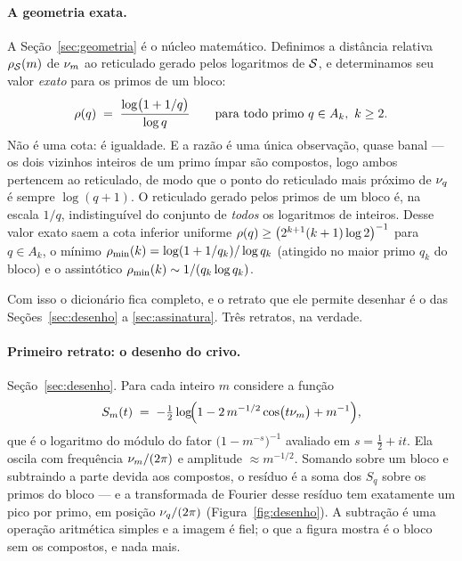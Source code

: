 \paragraph{A geometria exata.} A Seção~\ref{sec:geometria} é o núcleo matemático.
Definimos a distância relativa $\rho_{\mathcal{S}}(m)$ de $\nu_{m}$ ao reticulado
gerado pelos logaritmos de $\mathcal{S}$, e determinamos seu valor \emph{exato} para os
primos de um bloco:
\begin{equation}\label{eq:rhoexato}
  \rho(q) \;=\; \frac{\log\bigl(1+1/q\bigr)}{\log q}
  \qquad \text{para todo primo } q \in A_k,\ k\ge 2 .
\end{equation}
Não é uma cota: é igualdade. E a razão é uma única observação, quase banal — os
dois vizinhos inteiros de um primo ímpar são compostos, logo ambos pertencem ao
reticulado, de modo que o ponto do reticulado mais próximo de $\nu_{q}$ é sempre
$\log(q+1)$. O reticulado gerado pelos primos de um bloco é, na escala $1/q$,
indistinguível do conjunto de \emph{todos} os logaritmos de inteiros. Desse valor
exato saem a cota inferior uniforme
$\rho(q) \ge \bigl(2^{k+1}(k+1)\log 2\bigr)^{-1}$ para $q \in A_k$, o mínimo
$\rho_{\min}(k) = \log(1+1/q_k)/\log q_k$ (atingido no maior primo $q_k$ do bloco)
e o assintótico $\rho_{\min}(k) \sim 1/(q_k \log q_k)$.

Com isso o dicionário fica completo, e o retrato que ele permite desenhar é o das
Seções~\ref{sec:desenho} a \ref{sec:assinatura}. Três retratos, na verdade.

\paragraph{Primeiro retrato: o desenho do crivo.} Seção~\ref{sec:desenho}. Para
cada inteiro $m$ considere a função
\[
  S_m(t) \;=\; -\tfrac12 \log\!\Bigl(1 - 2\,m^{-1/2}\cos\bigl(t\nu_{m}\bigr)
  + m^{-1}\Bigr) ,
\]
que é o logaritmo do módulo do fator $\bigl(1-m^{-s}\bigr)^{-1}$ avaliado em
$s=\tfrac12+it$. Ela oscila com frequência $\nu_{m}/(2\pi)$ e amplitude
$\approx m^{-1/2}$. Somando sobre um bloco e subtraindo a parte devida aos
compostos, o resíduo é a soma dos $S_q$ sobre os primos do bloco — e a
transformada de Fourier desse resíduo tem exatamente um pico por primo, em
posição $\nu_{q}/(2\pi)$ (Figura~\ref{fig:desenho}). A subtração é uma operação
aritmética simples e a imagem é fiel; o que a figura mostra é o bloco sem os
compostos, e nada mais.

